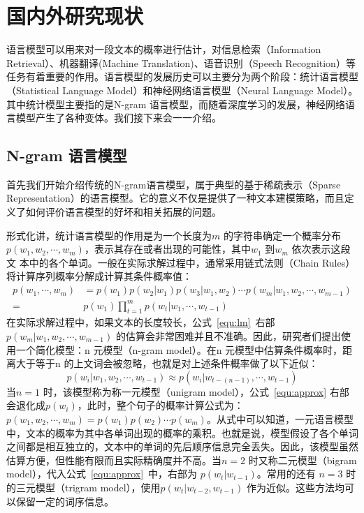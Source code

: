 \section{国内外研究现状}
语言模型可以用来对一段文本的概率进行估计，对信息检索（Information Retrieval）、机器翻译(Machine Translation)、语音识别（Speech Recognition）等任务有着重要的作用。语言模型的发展历史可以主要分为两个阶段：统计语言模型（Statistical Language Model）和神经网络语言模型（Neural Language Model）。其中统计模型主要指的是N-gram 语言模型，而随着深度学习的发展，神经网络语言模型产生了各种变体。我们接下来会一一介绍。

\subsection{N-gram 语言模型}
首先我们开始介绍传统的N-gram语言模型，属于典型的基于稀疏表示（Sparse Representation）的语言模型。它的意义不仅是提供了一种文本建模策略，而且定义了如何评价语言模型的好坏和相关拓展的问题。

形式化讲，统计语言模型的作用是为一个长度为$m$ 的字符串确定一个概率分布$p(w_1,w_2,\cdots,w_m)$，表示其存在或者出现的可能性，其中$w_1$ 到$w_m$ 依次表示这段文
本中的各个单词。一般在实际求解过程中，通常采用链式法则（Chain Rules）将计算序列概率分解成计算其条件概率值：
\begin{equation}
\label{equ:lm}
\begin{split}
p(w_1,\cdots,w_m) &= p(w_1) p(w_2|w_1) p(w_3|w_1,w_2)\cdots p(w_m | w_1,w_2,\cdots,w_{m-1}) \\
=&p(w_1)\prod_{t=1}^{m}p(w_t|w_1,\cdots,w_{t-1})
\end{split}
\end{equation}
在实际求解过程中，如果文本的长度较长，公式~\ref{equ:lm}~右部$ p(w_m | w_1,w_2,\cdots,w_{m-1}) $ 的估算会非常困难并且不准确。因此，研究者们提出使用一个简化模型：n 元模型（n-gram model）。在n 元模型中估算条件概率时，距离大于等于n 的上文词会被忽略，也就是对上述条件概率做了以下近似：
\begin{equation}
\label{equ:approx}
p(w_i | w_1,w_2,\cdots,w_{t-1})  \approx p(w_i | w_{t-(n-1)},\cdots,w_{t-1})
\end{equation}
当$n = 1$ 时，该模型称为称一元模型（unigram model），公式~\ref{equ:approx} 右部会退化成$p(w_i)$，此时，整个句子的概率计算公式为：$p(w_1,w_2,\cdots,w_m) = p(w_1)p(w_2) \cdots p(w_m)$。从式中可以知道，一元语言模型中，文本的概率为其中各单词出现的概率的乘积。也就是说，模型假设了各个单词之间都是相互独立的，文本中的单词的先后顺序信息完全丢失。因此，该模型虽然估算方便，但性能有限而且实际精确度并不高。当$n = 2$ 时又称二元模型（bigram model），代入公式~\ref{equ:approx}~中，右部为 $p(w_t|w_{t-1})$。常用的还有 $n = 3$ 时的三元模型（trigram model），使用$p(w_t |w_{t-2},w_{t-1})$ 作为近似。这些方法均可以保留一定的词序信息。


